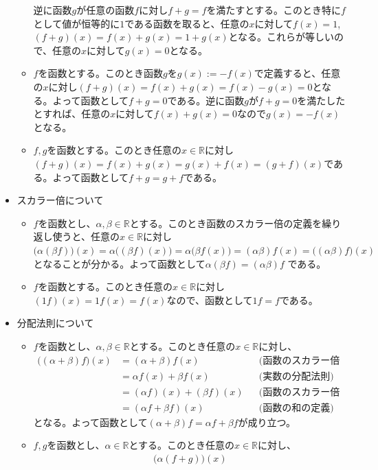 \begin{itemize}
\begin{itemize}
逆に函数$g$が任意の函数$f$に対し$f + g = f$を満たすとする。このとき特に$f$として値が恒等的に$1$である函数を取ると、任意の$x$に対して$f(x) = 1$, $(f + g)(x) = f(x) + g(x) = 1 + g(x)$となる。これらが等しいので、任意の$x$に対して$g(x) = 0$となる。
\item $f$を函数とする。このとき函数$g$を$g(x) := -f(x)$で定義すると、任意の$x$に対し$(f + g)(x) = f(x) + g(x) = f(x) - g(x) =0$となる。よって函数として$f + g = 0$である。逆に函数$g$が$f + g = 0$を満たしたとすれば、任意の$x$に対して$f(x) + g(x) = 0$なので$g(x) = -f(x)$となる。
\item $f, g$を函数とする。このとき任意の$x\in\mathbb{R}$に対し$(f + g)(x) = f(x) + g(x) = g(x) + f(x) = (g + f)(x)$である。よって函数として$f + g = g + f$である。
\end{itemize}
\item スカラー倍について
\begin{itemize}
\item $f$を函数とし、$\alpha,\beta\in\mathbb{R}$とする。このとき函数のスカラー倍の定義を繰り返し使うと、任意の$x\in\mathbb{R}$に対し$\bigl(\alpha(\beta f)\bigr)(x) = \alpha\bigl((\beta f)(x)\bigr) = \alpha\bigl(\beta f(x)\bigr) = (\alpha \beta)f(x) = \bigl((\alpha\beta)f\bigr)(x)$となることが分かる。よって函数として$\alpha(\beta f) = (\alpha \beta)f$ である。
\item $f$を函数とする。このとき任意の$x\in\mathbb{R}$に対し$(1f)(x) = 1f(x) = f(x)$なので、函数として$1f = f$である。
\end{itemize}
\item 分配法則について
\begin{itemize}
\item $f$を函数とし、$\alpha, \beta\in\mathbb{R}$とする。このとき任意の$x\in\mathbb{R}$に対し、
\begin{align*}
\bigl((\alpha + \beta)f\bigr)(x)
&= (\alpha + \beta)f(x) & & \text{(函数のスカラー倍の定義)} \\
&= \alpha f(x) + \beta f(x) & & \text{(実数の分配法則)} \\
&= (\alpha f)(x) + (\beta f)(x) & & \text{(函数のスカラー倍の定義)} \\
&= (\alpha f  + \beta f)(x) & & \text{(函数の和の定義)}
\end{align*}
となる。よって函数として$(\alpha + \beta)f = \alpha f + \beta f$が成り立つ。
\item $f, g$を函数とし、$\alpha\in\mathbb{R}$とする。このとき任意の$x\in\mathbb{R}$に対し、
\begin{align*}
\bigl(\alpha(f + g)\bigr)(x)

\end{align*}
\end{itemize}
\end{itemize}
